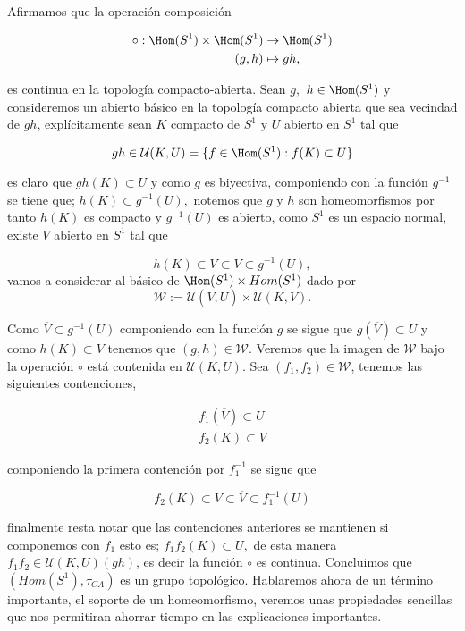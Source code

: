 Afirmamos que la operación composición

\begin{align*}
\circ:\Hom(S^1) \times \Hom(S^1) & \to \Hom(S^1) \\
(g,h) & \mapsto gh,
\end{align*} 

es continua en la topología compacto-abierta. Sean $g,$ $h \in \Hom(S^1)$ y consideremos un abierto básico en la topología compacto abierta que sea vecindad de $gh$, explícitamente sean $K$ compacto de $S^1$ y $U$ abierto en $S^1$ tal que

$$gh \in\mathcal{U}(K,U)=\{f \in \Hom(S^1): f(K) \subset U\}$$

 es claro que $gh(K) \subset U$ y como $g$ es biyectiva,  componiendo con la función $g^{-1}$ se tiene que; $h(K) \subset g^{-1}(U),$ notemos que $g$ y $h$ son homeomorfismos por tanto $h(K)$ es compacto y $g^{-1}(U)$ es abierto, como $S^1$ es un espacio normal, existe $V$ abierto en $S^1$ tal que 

$$h(K) \subset V \subset \overline{V} \subset g^{-1}(U),$$
vamos a considerar al básico de   $\Hom(S^1) \times Hom(S^1)$ dado por  
$$\mathcal{W}:=\mathcal{U}(\overline{V},U) \times \mathcal{U}(K,V).$$

Como $\overline{V} \subset g^{-1}(U)$ componiendo con la función $g$ se sigue que $g(\overline{V}) \subset U$ y como $h(K) \subset V$ tenemos que $(g,h) \in \mathcal{W}$. Veremos que la imagen de $\mathcal{W}$ bajo la operación $\circ$ está contenida en $\mathcal{U}(K,U)$. Sea $(f_1,f_2) \in \mathcal{W}$, tenemos las siguientes contenciones,  

\begin{align*}
f_1(\overline{V})\subset U \\
f_2(K)\subset V 
\end{align*}

componiendo la primera contención por $f_1^{-1}$ se sigue que

$$f_2(K) \subset V \subset \overline{V} \subset f_1^{-1}(U)$$

finalmente resta notar que las contenciones anteriores se mantienen si componemos con $f_1$ esto es; $f_1f_2(K) \subset U,$ de esta manera $f_1f_2 \in \mathcal{U}(K,U)(gh)$, es decir la función $\circ$ es continua. Concluimos que $(Hom(S^1), \tau_{CA})$ es un grupo topológico. Hablaremos ahora de un término importante, el soporte de un homeomorfismo, veremos unas propiedades sencillas que nos permitiran ahorrar tiempo en las explicaciones importantes. 


